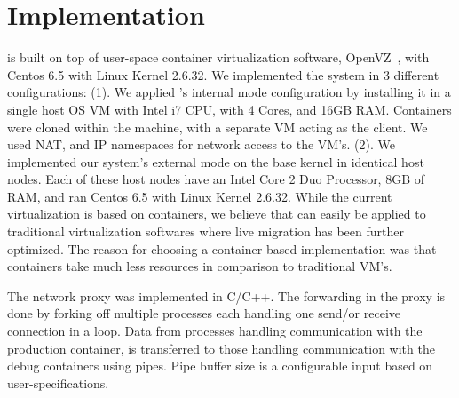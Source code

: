 
\section{Implementation}
\label{sec:implementation}

\parikshan is built on top of user-space container virtualization software, OpenVZ~\cite{openvz}, with Centos 6.5 with Linux Kernel 2.6.32.
We implemented the system in 3 different configurations: 
(1). We applied \parikshan 's internal mode configuration by installing it in a single host OS VM with Intel i7 CPU, with 4 Cores, and 16GB RAM. 
Containers were cloned within the machine, with a separate VM acting as the client.
We used NAT, and IP namespaces for network access to the VM's.
(2). We implemented our system's external mode on the base kernel in identical host nodes. 
Each of these host nodes have an Intel Core 2 Duo Processor, 8GB of RAM, and ran Centos 6.5 with Linux Kernel 2.6.32.
While the current virtualization is based on containers, we believe that \parikshan can easily be applied to traditional virtualization softwares where live migration has been further optimized.
The reason for choosing a container based implementation was that containers take much less resources in comparison to traditional VM's.

The network proxy was implemented in C/C++.
The forwarding in the proxy is done by forking off multiple processes each handling one send/or receive connection in a loop.
Data from processes handling communication with the production container, is  transferred to those handling communication with the debug containers using pipes.
Pipe buffer size is a configurable input based on user-specifications. 